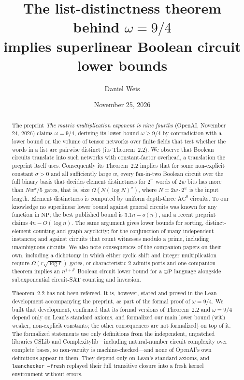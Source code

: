 \documentclass[11pt]{article}
\title{The list-distinctness theorem behind $\omega = 9/4$\\ implies superlinear Boolean circuit lower bounds}
\author{Daniel Weis}
\date{November 25, 2026}
\theoremstyle{definition}
\begin{document}
\maketitle

\begin{abstract}
The preprint \emph{The matrix multiplication exponent is nine fourths} (OpenAI, November 24, 2026) claims $\omega = 9/4$, deriving its lower bound $\omega \ge 9/4$ by contradiction with a lower bound on the volume of tensor networks over finite fields that test whether the words in a list are pairwise distinct (its Theorem~2.2). We observe that Boolean circuits translate into such networks with constant-factor overhead, a translation the preprint itself uses. Consequently its Theorem~2.2 implies that for some non-explicit constant $\sigma>0$ and all sufficiently large $w$, every fan-in-two Boolean circuit over the full binary basis that decides element distinctness for $2^w$ words of $2w$ bits has more than $N w^{\sigma}/5$ gates, that is, size $\Omega(N(\log N)^{\sigma})$, where $N = 2w\cdot 2^w$ is the input length. Element distinctness is computed by uniform depth-three $\mathrm{AC}^0$ circuits. To our knowledge no superlinear lower bound against general circuits was known for any function in $\mathrm{NP}$; the best published bound is $3.1n-o(n)$, and a recent preprint claims $4n-O(\log n)$. The same argument gives lower bounds for sorting, distinct-element counting and graph acyclicity; for the conjunction of many independent instances; and against circuits that count witnesses modulo a prime, including unambiguous circuits. We also note consequences of the companion papers on their own, including a dichotomy in which either cyclic shift and integer multiplication require $\Omega(r\sqrt{\log r})$ gates, or characteristic $2$ admits ports and one companion theorem implies an $n^{1+\delta'}$ Boolean circuit lower bound for a $\oplus\mathrm{P}$ language alongside subexponential circuit-SAT counting and inversion.

Theorem~2.2 has not been refereed. It is, however, stated and proved in the Lean development accompanying the preprint, as part of the formal proof of $\omega = 9/4$. We built that development, confirmed that its formal versions of Theorem~2.2 and $\omega=9/4$ depend only on Lean's standard axioms, and formalized our main lower bound (with weaker, non-explicit constants; the other consequences are not formalized) on top of it. The formalized statements use only definitions from the independent, unpatched libraries CSLib and Complexitylib---including natural-number circuit complexity over complete bases, so non-vacuity is machine-checked---and none of OpenAI's own definitions appear in them. They depend only on Lean's standard axioms, and \texttt{leanchecker --fresh} replayed their full transitive closure into a fresh kernel environment without errors.
\end{abstract}
\end{document}
